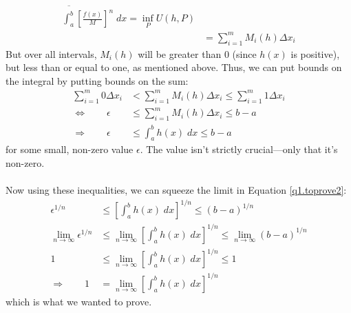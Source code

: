 \documentclass[12pt]{article}
\theoremstyle{plain}
\theoremstyle{definition}
\theoremstyle{remark}
\begin{document}
\begin{enumerate}
\begin{align*}
    \overline{\int^b_a} \left[\frac{f(x)}{M}\right]^n \; dx =
    \inf_P U(h, P) \\
    &= \sum^m_{i=1} M_i(h) \Delta x_i  
\end{align*}
But over all intervals, $M_i(h)$ will be greater than 0 (since $h(x)$ is positive), but less than or equal to one, as mentioned above. Thus, we can put bounds on the integral by putting bounds on the sum:
\begin{align*}
    \sum^m_{i=1} 0 \Delta x_i  &< 
    \sum^m_{i=1} M_i(h) \Delta x_i  \leq
    \sum^m_{i=1} 1 \Delta x_i  \\
    \Leftrightarrow \qquad 
    \epsilon  &\leq 
    \sum^m_{i=1} M_i(h) \Delta x_i  
    \leq  b-a  \\
    \Rightarrow \qquad 
    \epsilon  &\leq
    \int^b_a h(x) \; dx   \leq
    b-a  
\end{align*}
for some small, non-zero value $\epsilon$. The value isn't strictly crucial---only that it's non-zero.
\\
\\
Now using these inequalities, we can squeeze the limit in Equation \ref{q1.toprove2}:
\begin{align*}
    \epsilon^{1/n}  &\leq
    \left[\int^b_a h(x) \; dx\right]^{1/n}   \leq
    (b-a)^{1/n} \\
    \lim_{n\rightarrow\infty} \epsilon^{1/n}  &\leq
    \lim_{n\rightarrow\infty} \left[\int^b_a h(x) \; dx\right]^{1/n}   \leq
    \lim_{n\rightarrow\infty} (b-a)^{1/n} \\
    1  &\leq
    \lim_{n\rightarrow\infty} \left[\int^b_a h(x) \; dx\right]^{1/n}   \leq 1 \\
    \Rightarrow \qquad
    1 &= \lim_{n\rightarrow\infty} \left[\int^b_a h(x) \; dx\right]^{1/n}
\end{align*}
which is what we wanted to prove.



\end{enumerate}
\end{document}
